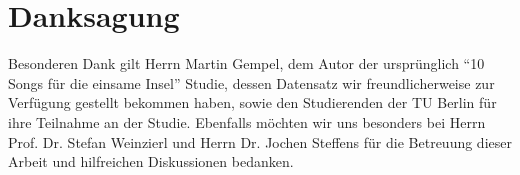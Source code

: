\section*{Danksagung}
\label{sec:Danksagung}
Besonderen Dank gilt Herrn Martin Gempel, dem Autor der ursprünglich "`10 Songs für die einsame Insel"' Studie, dessen Datensatz wir freundlicherweise zur Verfügung gestellt bekommen haben, sowie den Studierenden der TU Berlin für ihre Teilnahme an der Studie.
Ebenfalls möchten wir uns besonders  bei Herrn Prof. Dr. Stefan Weinzierl und Herrn Dr. Jochen Steffens für die Betreuung dieser Arbeit und hilfreichen Diskussionen bedanken.